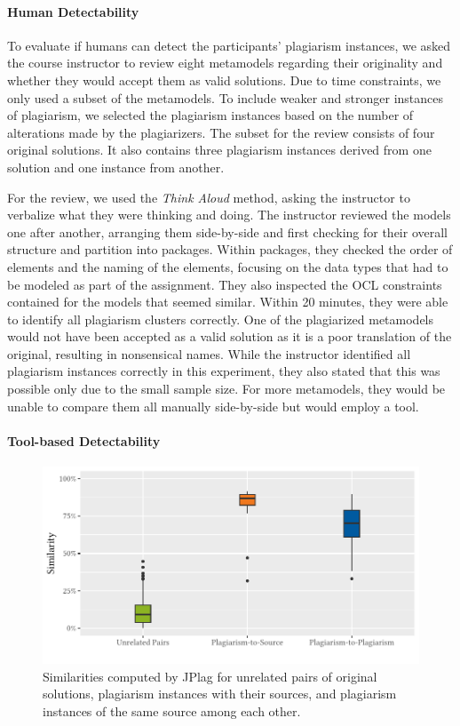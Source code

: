 \paragraph{Human Detectability}
To evaluate if humans can detect the participants' plagiarism instances, we asked the course instructor to review eight metamodels regarding their originality and whether they would accept them as valid solutions.
Due to time constraints, we only used a subset of the metamodels.
To include weaker and stronger instances of plagiarism, we selected the plagiarism instances based on the number of alterations made by the plagiarizers.
The subset for the review consists of four original solutions. It also contains three plagiarism instances derived from one solution and one instance from another.

For the review, we used the \textit{Think Aloud} method, asking the instructor to verbalize what they were thinking and doing. 
The instructor reviewed the models one after another, arranging them side-by-side and first checking for their overall structure and partition into packages. Within packages, they checked the order of elements and the naming of the elements, focusing on the data types that had to be modeled as part of the assignment. They also inspected the \ac{OCL} constraints contained for the models that seemed similar.
%
Within 20 minutes, they were able to identify all plagiarism clusters correctly. One of the plagiarized metamodels would not have been accepted as a valid solution as it is a poor translation of the original, resulting in nonsensical names. 
%
While the instructor identified all plagiarism instances correctly in this experiment, they also stated that this was possible only due to the small sample size. For more metamodels, they would be unable to compare them all manually side-by-side but would employ a tool. 

\paragraph{Tool-based Detectability}

\begin{figure}
    \centering
    \includegraphics[width=\linewidth]{figures/mde/experiment_avg.similarity.pdf}
    \caption[Detecting Human Obfuscation]{Similarities computed by JPlag for unrelated pairs of original solutions, plagiarism instances with their sources, and plagiarism instances of the same source among each other.}
    \label{fig:jplag-student-obf}
\end{figure} 
    
